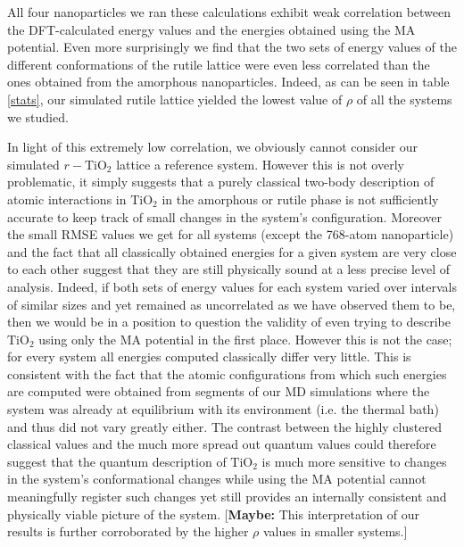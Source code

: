 \documentclass[aps,prb,twocolumn,amsmath,amssymb,superscriptaddress,longbibliography]{revtex4-1}
\newcommand\tab[1][1cm]{\hspace*{#1}} %
\begin{document}
\tab All four nanoparticles we ran these calculations exhibit weak correlation between the DFT-calculated energy values and the energies obtained using the MA potential. 
Even more surprisingly we find that the two sets of energy values of the different conformations of the rutile lattice were even less correlated than the ones obtained from the amorphous nanoparticles. 
Indeed, as can be seen in table \ref{stats}, our simulated rutile lattice yielded the lowest value of $\rho$ of all the systems we studied.

In light of this extremely low correlation, we obviously cannot consider our simulated $r-\text{TiO}_2$ lattice a reference system. 
However this is not overly problematic, it simply suggests that a purely classical two-body description of atomic interactions in $\text{TiO}_2$ in the amorphous or rutile phase is not sufficiently accurate to keep track of small changes in the system's configuration.
Moreover the small RMSE values we get for all systems (except the 768-atom nanoparticle) and the fact that all classically obtained energies for a given system are very close to each other suggest that they are still physically sound at a less precise level of analysis.
Indeed, if both sets of energy values for each system varied over intervals of similar sizes and yet remained as uncorrelated as we have observed them to be, then we would be in a position to question the validity of even trying to describe $\text{TiO}_2$ using only the MA potential in the first place.
However this is not the case; for every system all energies computed classically differ very little.
This is consistent with the fact that the atomic configurations from which such energies are computed were obtained from segments of our MD simulations where the system was already at equilibrium with its environment (i.e. the thermal bath) and thus did not vary greatly either.
The contrast between the highly clustered classical values and the much more spread out quantum values could therefore suggest that the quantum description of $\text{TiO}_2$ is much more sensitive to changes in the system's conformational changes while using the MA potential cannot meaningfully register such changes yet still provides an internally consistent and physically viable picture of the system.
[\textbf{Maybe: } This interpretation of our results is further corroborated by the higher $\rho$ values in smaller systems.] 
\end{document}
